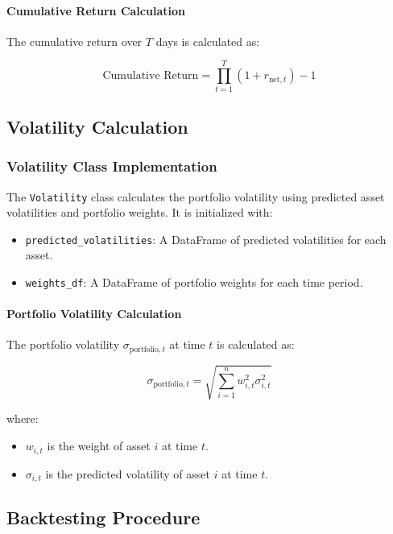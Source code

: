 \paragraph{Cumulative Return Calculation}

The cumulative return over \( T \) days is calculated as:

\[
\text{Cumulative Return} = \prod_{t=1}^T (1 + r_{\text{net}, t}) - 1
\]

\subsection{Volatility Calculation}

\subsubsection{Volatility Class Implementation}

The \texttt{Volatility} class calculates the portfolio volatility using predicted asset volatilities and portfolio weights. It is initialized with:

\begin{itemize}
    \item \texttt{predicted\_volatilities}: A DataFrame of predicted volatilities for each asset.
    \item \texttt{weights\_df}: A DataFrame of portfolio weights for each time period.
\end{itemize}

\paragraph{Portfolio Volatility Calculation}

The portfolio volatility \( \sigma_{\text{portfolio}, t} \) at time \( t \) is calculated as:

\[
\sigma_{\text{portfolio}, t} = \sqrt{\sum_{i=1}^n w_{i, t}^2 \sigma_{i, t}^2}
\]

where:

\begin{itemize}
    \item \( w_{i, t} \) is the weight of asset \( i \) at time \( t \).
    \item \( \sigma_{i, t} \) is the predicted volatility of asset \( i \) at time \( t \).
\end{itemize}

\subsection{Backtesting Procedure}

